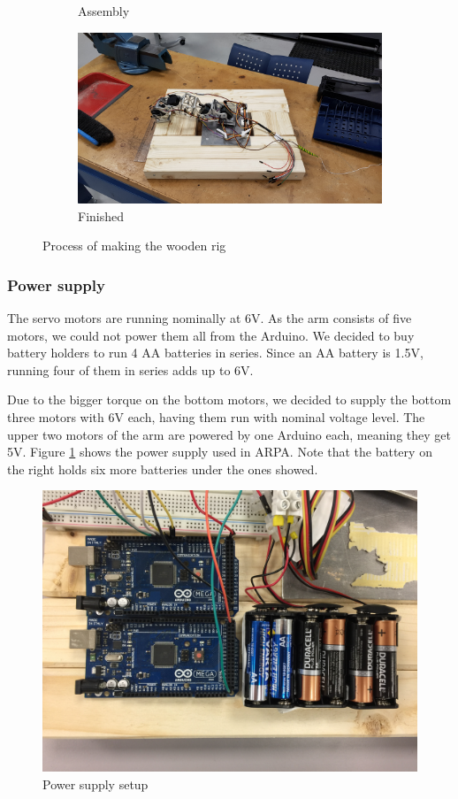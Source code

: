 \documentclass[11pt,a4paper, titlepage]{article}
\begin{document}
\begin{figure}[H]
\begin{subfigure}[b]{0.45\linewidth}
\caption{Assembly}              		
\end{subfigure}
\begin{subfigure}[b]{0.45\linewidth}
\includegraphics[width=\textwidth]{../Diagrams/plank4.jpg}  
\caption{Finished}              		
\end{subfigure}
\caption{Process of making the wooden rig}
\end{figure}

	\subsubsection{Power supply}
	The servo motors are running nominally at 6V. As the arm consists of five motors, we could not power them all from the Arduino. We decided to buy battery holders to run 4 AA batteries in series. Since an AA battery is 1.5V, running four of them in series adds up to 6V.
	
	Due to the bigger torque on the bottom motors, we decided to supply the bottom three motors with 6V each,  having them run with nominal voltage level. The upper two motors of the arm are powered by one Arduino each, meaning they get 5V. Figure \ref{fig:power} shows the power supply used in ARPA. Note that the battery on the right holds six more batteries under the ones showed.
	
	\begin{figure}[H]
		\centering
		\includegraphics[width=0.8\linewidth]{../Diagrams/PowerSupply.jpg}
		\caption{Power supply setup}
		\label{fig:power}
	\end{figure}
	
\end{document}
